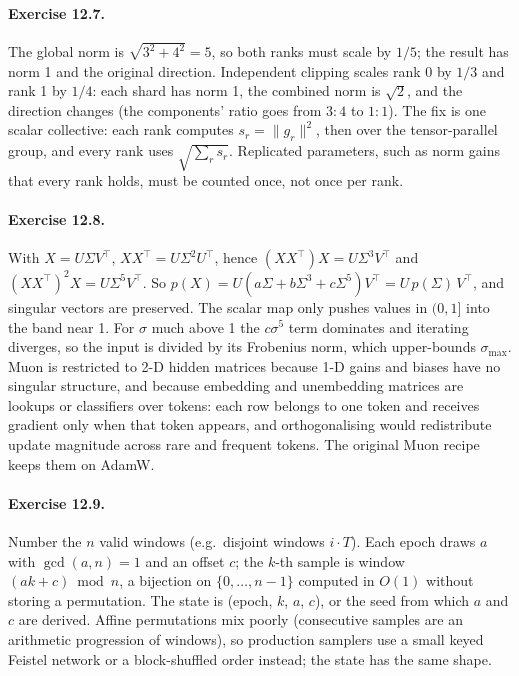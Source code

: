 \paragraph{Exercise 12.7.} The global norm is $\sqrt{3^2+4^2}=5$, so both ranks must scale by
$1/5$; the result has norm 1 and the original direction. Independent clipping scales rank 0 by
$1/3$ and rank 1 by $1/4$: each shard has norm 1, the combined norm is $\sqrt2$, and the
direction changes (the components' ratio goes from $3:4$ to $1:1$). The fix is one scalar
collective: each rank computes $s_r=\|g_r\|^2$, then  over the
tensor-parallel group, and every rank uses $\sqrt{\sum_r s_r}$. Replicated parameters, such as
norm gains that every rank holds, must be counted once, not once per rank.

\paragraph{Exercise 12.8.} With $X=U\Sigma V^\top$, $XX^\top=U\Sigma^2U^\top$, hence
$(XX^\top)X=U\Sigma^3V^\top$ and $(XX^\top)^2X=U\Sigma^5V^\top$. So
$p(X)=U(a\Sigma+b\Sigma^3+c\Sigma^5)V^\top=U\,p(\Sigma)\,V^\top$, and singular vectors are
preserved. The scalar map only pushes values in $(0,1]$ into the band near 1. For $\sigma$ much
above 1 the $c\sigma^5$ term dominates and iterating diverges, so the input is divided by its
Frobenius norm, which upper-bounds $\sigma_{\max}$. Muon is restricted to 2-D hidden matrices
because 1-D gains and biases have no singular structure, and because embedding and unembedding
matrices are lookups or classifiers over tokens: each row belongs to one token and receives
gradient only when that token appears, and orthogonalising would redistribute update magnitude
across rare and frequent tokens. The original Muon recipe keeps them on AdamW.

\paragraph{Exercise 12.9.} Number the $n$ valid windows (e.g.\ disjoint windows $i\cdot T$).
Each epoch draws $a$ with $\gcd(a,n)=1$ and an offset $c$; the $k$-th sample is window
$(a k + c)\bmod n$, a bijection on $\{0,\dots,n-1\}$ computed in $O(1)$ without storing a
permutation. The state is (epoch, $k$, $a$, $c$), or the seed from which $a$ and $c$ are derived.
Affine permutations mix poorly (consecutive samples are an arithmetic progression of windows), so
production samplers use a small keyed Feistel network or a block-shuffled order instead; the
state has the same shape.


